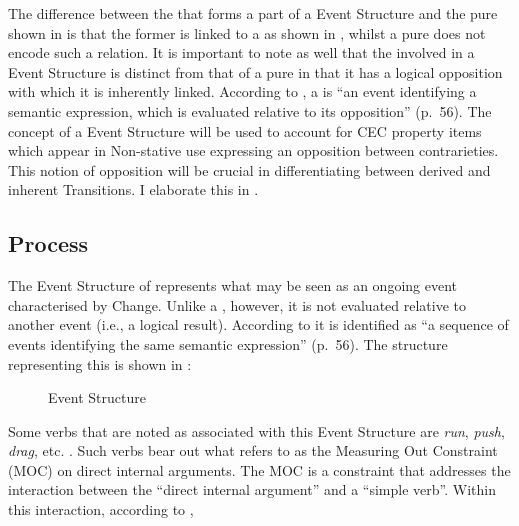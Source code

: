 The difference between the  that forms a part of a 
Event Structure and the pure  shown in  is that the
former is linked to a  as shown in , whilst a pure
 does not encode such a relation.  It is important to note as
well that the  involved in a  Event Structure is
distinct from that of a pure  in that it has a logical
opposition with which it is inherently linked.  According to
\citet{Pustejovsky1991}, a  is ``an event identifying a
semantic expression, which is evaluated relative to its opposition”
(p.~56).  The concept of a  Event
Structure will be used to account for CEC property items which appear
in Non-stative use expressing an opposition between contrarieties.
This notion of opposition will be crucial in differentiating between
derived and inherent Transitions.  I elaborate this in
.

\subsection{Process}\label{sec:4.2.4}

The Event Structure of  represents what may be seen as an
ongoing event characterised by Change.  Unlike a , however,
it is not evaluated relative to another event (i.e.,  a logical
result).  According to \citet{Pustejovsky1991} it is identified as ``a
sequence of events identifying the same semantic expression” (p.~56).
The structure representing this is shown in :


\begin{figure}
\caption{ Event Structure \citep[56]{Pustejovsky1991}\label{ex:4:8}}
\fbox{\parbox{5cm}{\centering
\begin{forest}
[P
  [e$_1$,no edge]
  [~~~...~~~,roof]
  [e$_n$, no edge]
]
\end{forest}
}}\end{figure}

Some verbs that are noted as associated with this Event Structure are
\textit{run}, \textit{push}, \textit{drag}, etc. \citep[56]{Pustejovsky1991}.  
Such verbs bear out what \citet{Tenny1994} refers to as the Measuring Out
Constraint (MOC) on direct internal arguments.  The MOC is a
constraint that addresses the interaction between the ``direct internal
argument” and a ``simple verb”. Within this interaction, according to
\citet{Tenny1994},

